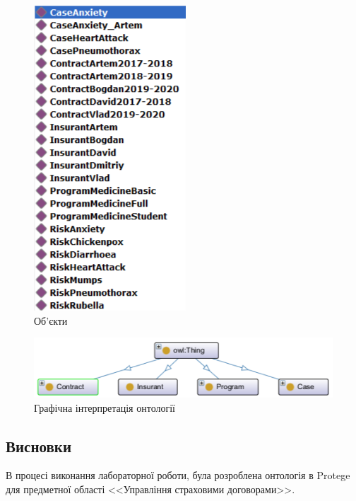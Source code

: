 \begin{figure}[H]
	\centering
	    \includegraphics{individuals}
	\caption{Об'єкти}
	\label{fig:individuals}
\end{figure}

\begin{figure}[H]
	\centering
	    \includegraphics{ontograph}
	\caption{Графічна інтерпретація онтології}
	\label{fig:ontograph}
\end{figure}

\subsection*{Висновки}
В процесі виконання лабораторної роботи, була розроблена онтологія в Protege для предметної області <<Управління страховими договорами>>.


